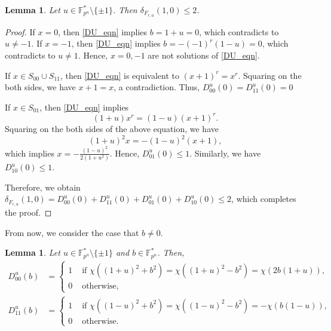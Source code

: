 \documentclass[11pt]{article}
\numberwithin{theorem}{section}
\newtheorem{lemma}[theorem]{Lemma}
\newcommand{\Fpnmul}{\mathbb{F}_{p^n}^*}
\begin{document}
\begin{lemma}\label{DU_lemma b=0}
	Let $u\in \Fpnmul \setminus \{\pm1\}$. Then $\delta_{F_{r,u}}(1,0)\le 2$.
\end{lemma}
\begin{proof}
	If $x=0$, then \eqref{DU_eqn} implies $b=1+u=0$, which contradicts to $u\ne -1$. If $x=-1$, then \eqref{DU_eqn} implies $b=-(-1)^r(1-u)=0$, which contradicts to $u\ne 1$. Hence, $x=0,-1$ are not solutions of \eqref{DU_eqn}.
	
	If $x\in S_{00}\cup S_{11}$, then \eqref{DU_eqn} is equivalent to $(x+1)^r=x^r$. Squaring on the both sides, we have $x+1=x$, a contradiction. Thus, $D_{00}^u(0)=D_{11}^u(0)=0$
	
	If $x\in S_{01}$, then \eqref{DU_eqn} implies
	\begin{equation*}
		(1+u)x^r=(1-u)(x+1)^r.
	\end{equation*}
	Squaring on the both sides of the above equation, we have
	\begin{equation*}
		(1+u)^2x=-(1-u)^2(x+1),
	\end{equation*}
	which implies $x=-\frac{(1-u)^2}{2(1+u^2)}$. Hence, $D_{01}^u(0)\le 1$. Similarly, we have $D_{10}^u(0)\le 1$. 
	
	Therefore, we obtain $\delta_{F_{r,u}}(1,0)=D_{00}^u(0)+D_{11}^u(0)+D_{01}^u(0)+D_{10}^u(0)\le 2$, which completes the proof.
\end{proof}

From now, we consider the case that $b\ne 0$.

\begin{lemma}\label{DU_lemma S0011}
	Let $u\in \Fpnmul \setminus \{\pm1\}$ and $b\in \Fpnmul$. Then, 
	\begin{align*}
		D_{00}^u(b)&=
		\begin{cases}
			1 &\text{ if }\chi((1+u)^2+b^2)=\chi((1+u)^2-b^2)=\chi(2b(1+u)),\\
			0 &\text{ otherwise,}
		\end{cases}
		\\ 
		D_{11}^u(b)&=
		\begin{cases}
			1 &\text{ if }\chi((1-u)^2+b^2)=\chi((1-u)^2-b^2)=-\chi(b(1-u)),\\
			0 &\text{ otherwise.}
		\end{cases}
	\end{align*}
\end{lemma}
\end{document}
